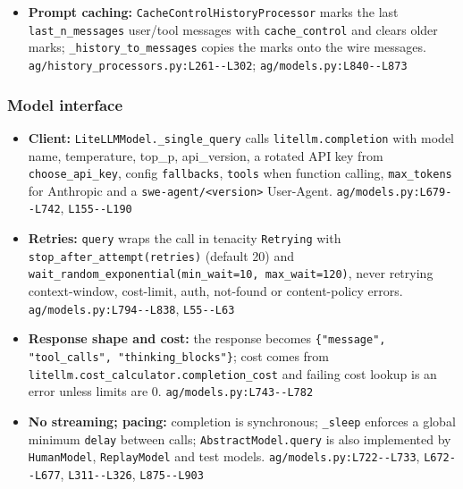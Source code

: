 \begin{itemize}
\item \textbf{Prompt caching:} \texttt{CacheControlHistoryProcessor} marks the last \texttt{last\_\allowbreak{}n\_\allowbreak{}messages} user/tool messages with \texttt{cache\_\allowbreak{}control} and clears older marks; \texttt{\_\allowbreak{}history\_\allowbreak{}to\_\allowbreak{}messages} copies the marks onto the wire messages. \texttt{ag/\allowbreak{}history\_\allowbreak{}processors.\allowbreak{}py:\allowbreak{}L261-\allowbreak{}-\allowbreak{}L302}; \texttt{ag/\allowbreak{}models.\allowbreak{}py:\allowbreak{}L840-\allowbreak{}-\allowbreak{}L873}
\end{itemize}

\subsubsection*{Model interface}
\begin{itemize}
\item \textbf{Client:} \texttt{LiteLLMModel.\allowbreak{}\_\allowbreak{}single\_\allowbreak{}query} calls \texttt{litellm.\allowbreak{}completion} with model name, temperature, top\_p, api\_version, a rotated API key from \texttt{choose\_\allowbreak{}api\_\allowbreak{}key}, config \texttt{fallbacks}, \texttt{tools} when function calling, \texttt{max\_\allowbreak{}tokens} for Anthropic and a \texttt{swe-\allowbreak{}agent/\allowbreak{}<version>} User-Agent. \texttt{ag/\allowbreak{}models.\allowbreak{}py:\allowbreak{}L679-\allowbreak{}-\allowbreak{}L742}, \texttt{L155-\allowbreak{}-\allowbreak{}L190}
\item \textbf{Retries:} \texttt{query} wraps the call in tenacity \texttt{Retrying} with \texttt{stop\_\allowbreak{}after\_\allowbreak{}attempt(\allowbreak{}retries)} (default 20) and \texttt{wait\_\allowbreak{}random\_\allowbreak{}exponential(\allowbreak{}min\_\allowbreak{}wait=10, max\_\allowbreak{}wait=120)}, never retrying context-window, cost-limit, auth, not-found or content-policy errors. \texttt{ag/\allowbreak{}models.\allowbreak{}py:\allowbreak{}L794-\allowbreak{}-\allowbreak{}L838}, \texttt{L55-\allowbreak{}-\allowbreak{}L63}
\item \textbf{Response shape and cost:} the response becomes \texttt{\{"message", "tool\_\allowbreak{}calls", "thinking\_\allowbreak{}blocks"\}}; cost comes from \texttt{litellm.\allowbreak{}cost\_\allowbreak{}calculator.\allowbreak{}completion\_\allowbreak{}cost} and failing cost lookup is an error unless limits are 0. \texttt{ag/\allowbreak{}models.\allowbreak{}py:\allowbreak{}L743-\allowbreak{}-\allowbreak{}L782}
\item \textbf{No streaming; pacing:} completion is synchronous; \texttt{\_\allowbreak{}sleep} enforces a global minimum \texttt{delay} between calls; \texttt{AbstractModel.\allowbreak{}query} is also implemented by \texttt{HumanModel}, \texttt{ReplayModel} and test models. \texttt{ag/\allowbreak{}models.\allowbreak{}py:\allowbreak{}L722-\allowbreak{}-\allowbreak{}L733}, \texttt{L672-\allowbreak{}-\allowbreak{}L677}, \texttt{L311-\allowbreak{}-\allowbreak{}L326}, \texttt{L875-\allowbreak{}-\allowbreak{}L903}
\end{itemize}


